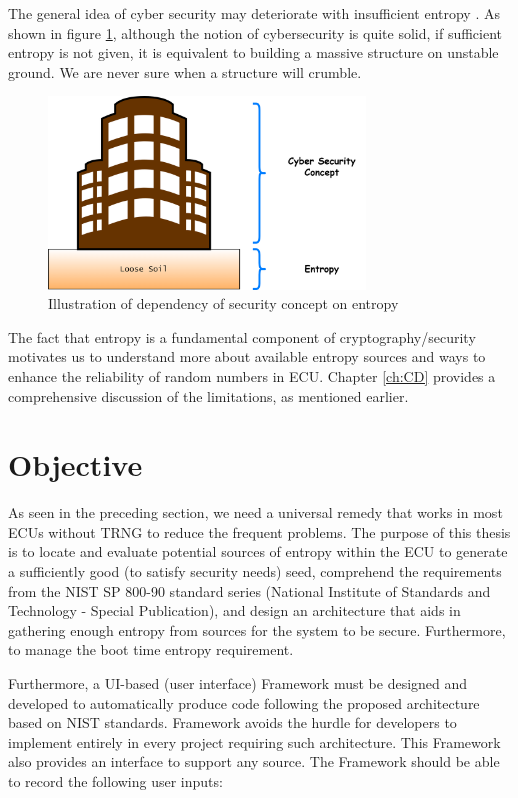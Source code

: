 The general idea of cyber security may deteriorate with insufficient entropy \cite{SP90B-2018}. As shown in figure \ref{fig:1:1}, although the notion of cybersecurity is quite solid, if sufficient entropy is not given, it is equivalent to building a massive structure on unstable ground. We are never sure when a structure will crumble.

\begin{figure}[!h]
	\centering
	\includegraphics[width=0.75\textwidth]{gfx/diagrams/EffectOfWeakEntropy}
	\caption{Illustration of dependency of security concept on entropy}
	\label{fig:1:1}
\end{figure}

The fact that entropy is a fundamental component of cryptography/security motivates us to understand more about available entropy sources and ways to enhance the reliability of random numbers in ECU. Chapter \ref{ch:CD} provides a comprehensive discussion of the limitations, as mentioned earlier.

%
%
\section{Objective}
\label{sec:intro:Objective}

As seen in the preceding section, we need a universal remedy that works in most ECUs without TRNG to reduce the frequent problems. The purpose of this thesis is to locate and evaluate potential sources of entropy within the ECU to generate a sufficiently good (to satisfy security needs) seed, comprehend the requirements from the NIST SP 800-90 standard series (National Institute of Standards and Technology - Special Publication), and design an architecture that aids in gathering enough entropy from sources for the system to be secure. Furthermore, to manage the boot time entropy requirement.

Furthermore, a UI-based (user interface) Framework must be designed and developed to automatically produce code following the proposed architecture based on NIST standards. Framework avoids the hurdle for developers to implement entirely in every project requiring such architecture. This Framework also provides an interface to support any source. The Framework should be able to record the following user inputs:

